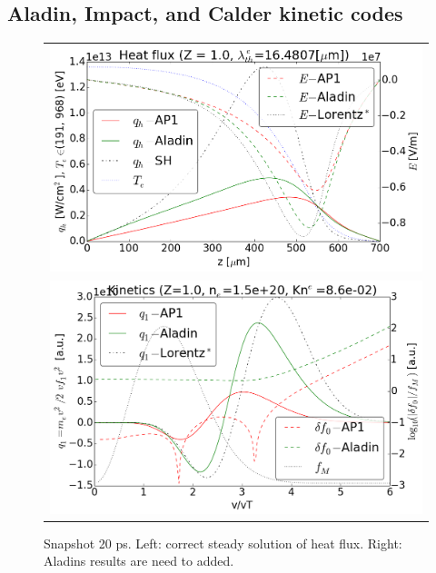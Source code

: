 \subsection{Aladin, Impact, and Calder kinetic codes}
\label{sec:AladinImpactCaldercodes}

\begin{figure}[tbh]
  \begin{center}
    \begin{tabular}{c}
      \includegraphics[width=\figscale\textwidth]{../VFPdata/C7_Aladin_case6_heatflux.png} \\
      \includegraphics[width=\figscale\textwidth]{../VFPdata/C7_Aladin_case6_kinetics.png}
    \end{tabular}
  \caption{  
  Snapshot 20 ps. Left: correct steady solution of heat flux. 
  Right: Aladins results are need to added.
  }
  \end{center}
  \label{fig:C7_Aladin_case3}
\end{figure}


